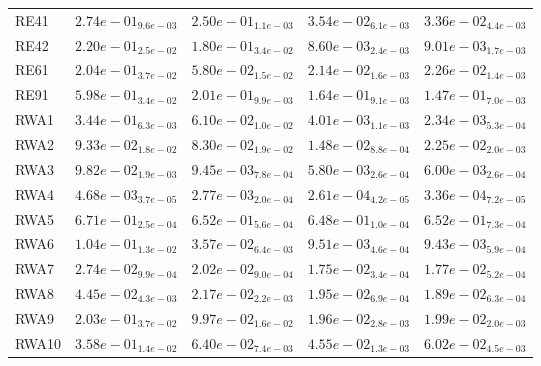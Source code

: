 \documentclass{article}
\begin{document}
\begin{table}
\begin{scriptsize}
\begin{tabular}{lllll}
RE41 & $  2.74e-01_{ 9.6e-03}$ & $  2.50e-01_{ 1.1e-03}$ & \cellcolor{gray25}$  3.54e-02_{ 6.1e-03}$ & \cellcolor{gray95}$  3.36e-02_{ 4.4e-03}$ \\
RE42 & $  2.20e-01_{ 2.5e-02}$ & $  1.80e-01_{ 3.4e-02}$ & \cellcolor{gray95}$  8.60e-03_{ 2.4e-03}$ & \cellcolor{gray25}$  9.01e-03_{ 1.7e-03}$ \\
RE61 & $  2.04e-01_{ 3.7e-02}$ & $  5.80e-02_{ 1.5e-02}$ & \cellcolor{gray95}$  2.14e-02_{ 1.6e-03}$ & \cellcolor{gray25}$  2.26e-02_{ 1.4e-03}$ \\
RE91 & $  5.98e-01_{ 3.4e-02}$ & $  2.01e-01_{ 9.9e-03}$ & \cellcolor{gray25}$  1.64e-01_{ 9.1e-03}$ & \cellcolor{gray95}$  1.47e-01_{ 7.0e-03}$ \\
RWA1 & $  3.44e-01_{ 6.3e-03}$ & $  6.10e-02_{ 1.0e-02}$ & \cellcolor{gray25}$  4.01e-03_{ 1.1e-03}$ & \cellcolor{gray95}$  2.34e-03_{ 5.3e-04}$ \\
RWA2 & $  9.33e-02_{ 1.8e-02}$ & $  8.30e-02_{ 1.9e-02}$ & \cellcolor{gray95}$  1.48e-02_{ 8.8e-04}$ & \cellcolor{gray25}$  2.25e-02_{ 2.0e-03}$ \\
RWA3 & $  9.82e-02_{ 1.9e-03}$ & $  9.45e-03_{ 7.8e-04}$ & \cellcolor{gray95}$  5.80e-03_{ 2.6e-04}$ & \cellcolor{gray25}$  6.00e-03_{ 2.6e-04}$ \\
RWA4 & $  4.68e-03_{ 3.7e-05}$ & $  2.77e-03_{ 2.0e-04}$ & \cellcolor{gray95}$  2.61e-04_{ 4.2e-05}$ & \cellcolor{gray25}$  3.36e-04_{ 7.2e-05}$ \\
RWA5 & $  6.71e-01_{ 2.5e-04}$ & $  6.52e-01_{ 5.6e-04}$ & \cellcolor{gray95}$  6.48e-01_{ 1.0e-04}$ & \cellcolor{gray25}$  6.52e-01_{ 7.3e-04}$ \\
RWA6 & $  1.04e-01_{ 1.3e-02}$ & $  3.57e-02_{ 6.4e-03}$ & \cellcolor{gray25}$  9.51e-03_{ 4.6e-04}$ & \cellcolor{gray95}$  9.43e-03_{ 5.9e-04}$ \\
RWA7 & $  2.74e-02_{ 9.9e-04}$ & $  2.02e-02_{ 9.0e-04}$ & \cellcolor{gray95}$  1.75e-02_{ 3.4e-04}$ & \cellcolor{gray25}$  1.77e-02_{ 5.2e-04}$ \\
RWA8 & $  4.45e-02_{ 4.3e-03}$ & $  2.17e-02_{ 2.2e-03}$ & \cellcolor{gray25}$  1.95e-02_{ 6.9e-04}$ & \cellcolor{gray95}$  1.89e-02_{ 6.3e-04}$ \\
RWA9 & $  2.03e-01_{ 3.7e-02}$ & $  9.97e-02_{ 1.6e-02}$ & \cellcolor{gray95}$  1.96e-02_{ 2.8e-03}$ & \cellcolor{gray25}$  1.99e-02_{ 2.0e-03}$ \\
RWA10 & $  3.58e-01_{ 1.4e-02}$ & $  6.40e-02_{ 7.4e-03}$ & \cellcolor{gray95}$  4.55e-02_{ 1.3e-03}$ & \cellcolor{gray25}$  6.02e-02_{ 4.5e-03}$ \\
\hline
\end{tabular}
\end{scriptsize}
\end{table}
\end{document}
